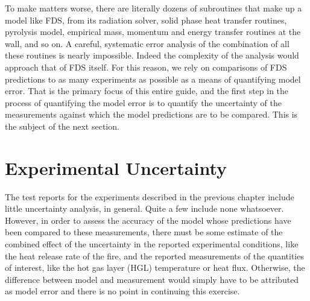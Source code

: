 To make matters worse, there are literally dozens of subroutines that make up a model like FDS, from its radiation solver, solid phase heat transfer routines, pyrolysis model,
empirical mass, momentum and energy transfer routines at the wall, and so on. A careful, systematic error analysis of the combination of all these routines is
nearly impossible. Indeed the complexity of the analysis would approach that of FDS itself. For this reason, we rely on comparisons of FDS predictions to as many
experiments as possible as a means of quantifying model error. That is the primary focus of this entire guide, and the first step in the process of quantifying the
model error is to quantify the uncertainty of the measurements against which the model predictions are to be compared. This is the subject of the next section.


\section{Experimental Uncertainty}

The test reports for the experiments described in the previous chapter include little uncertainty analysis, in general. Quite a
few include none whatsoever.
However, in order to assess the accuracy of the model whose predictions have been compared to these measurements, there must be some estimate of the
combined effect of the uncertainty in the reported experimental conditions, like the heat release rate of the fire,
and the reported measurements of the quantities of interest, like the hot gas layer (HGL)
temperature or heat flux. Otherwise, the difference between model and measurement would simply have to be attributed as model error and there is no point in
continuing this exercise.

